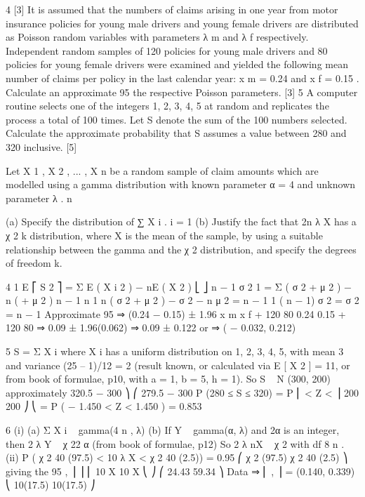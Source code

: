
4
[3]
It is assumed that the numbers of claims arising in one year from motor insurance
policies for young male drivers and young female drivers are distributed as Poisson
random variables with parameters λ m and λ f respectively.
Independent random samples of 120 policies for young male drivers and 80 policies
for young female drivers were examined and yielded the following mean number of
claims per policy in the last calendar year: x m = 0.24 and x f = 0.15 .
Calculate an approximate 95%
the respective Poisson parameters.
[3]
5
A computer routine selects one of the integers 1, 2, 3, 4, 5 at random and replicates
the process a total of 100 times. Let S denote the sum of the 100 numbers selected.
Calculate the approximate probability that S assumes a value between 280 and 320
inclusive.
[5]

Let X 1 , X 2 , ... , X n be a random sample of claim amounts which are modelled using a
gamma distribution with known parameter α = 4 and unknown parameter λ .
n
\item 
(a)
Specify the distribution of
∑ X i .
i = 1
(b)
Justify the fact that 2n λ X has a χ 2 k distribution, where X is the mean
of the sample, by using a suitable relationship between the gamma and
the χ 2 distribution, and specify the degrees of freedom k.



4
1
E ⎡ S 2 ⎤ =
{ Σ E ( X i 2 ) − nE ( X 2 )}
⎣ ⎦
n − 1
σ 2
1
=
{ Σ ( σ 2 + μ 2 ) − n ( + μ 2 )}
n − 1
n
1
{ n ( σ 2 + μ 2 ) − σ 2 − n μ 2 }
=
n − 1
1
{( n − 1) σ 2 } = σ 2
=
n − 1
Approximate 95%
⇒ (0.24 − 0.15) ± 1.96
x m x f
+
120 80
0.24 0.15
+
120
80
⇒ 0.09 ± 1.96(0.062) ⇒ 0.09 ± 0.122 or ⇒ ( − 0.032, 0.212)

5
S = Σ X i where X i has a uniform distribution on 1, 2, 3, 4, 5, with mean 3 and variance
(25 – 1)/12 = 2 (result known, or calculated via E [ X 2 ] = 11, or from book of formulae,
p10, with a = 1, b = 5, h = 1).
So S ~ N (300, 200) approximately
320.5 − 300 ⎞
⎛ 279.5 − 300
P (280 ≤ S ≤ 320) = P ⎜
< Z <
⎟
200
200 ⎠
⎝
= P ( − 1.450 < Z < 1.450 ) = 0.853

6
(i)
(a) Σ X i ~ gamma(4 n , λ)
(b) If Y ~ gamma(α, λ) and 2α is an integer, then 2 λ Y ~ χ 22 α (from book
of formulae, p12)
So 2 λ nX ~ χ 2 with df 8 n .
(ii)
P ( χ 2 40 (97.5) < 10 λ X < χ 2 40 (2.5)) = 0.95
⎛ χ 2 (97.5) χ 2 40 (2.5) ⎞
giving the 95%
,
⎟ ⎟
⎜ 10 X
10
X
⎝
⎠
⎛ 24.43
59.34 ⎞
Data ⇒ ⎜
,
⎟ = (0.140, 0.339)
⎝ 10(17.5) 10(17.5) ⎠

